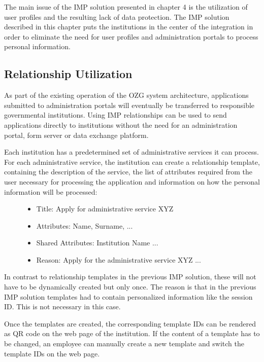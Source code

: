 The main issue of the IMP solution presented in chapter 4 is the utilization of user profiles and the resulting lack of data protection. The IMP solution described in this chapter puts the institutions in the center of the integration in order to eliminate the need for user profiles and administration portals to process personal information.

\subsection{Relationship Utilization}

As part of the existing operation of the OZG system architecture, applications submitted to administration portals will eventually be transferred to responsible governmental institutions. Using IMP relationships can be used to send applications directly to institutions without the need for an administration portal, form server or data exchange platform.

Each institution has a predetermined set of administrative services it can process. For each administrative service, the institution can create a relationship template, containing the description of the service, the list of attributes required from the user necessary for processing the application and information on how the personal information will be processed:

\begin{figure}[H]
\begin{itemize}
    \item Title: Apply for administrative service XYZ
    \item Attributes: Name, Surname, ... 
    \item Shared Attributes: Institution Name ...
    \item Reason: Apply for the administrative service XYZ ...
\end{itemize}
\end{figure}

In contrast to relationship templates in the previous IMP solution, these will not have to be dynamically created but only once. The reason is that in the previous IMP solution templates had to contain personalized information like the session ID. This is not necessary in this case.

Once the templates are created, the corresponding template IDs can be rendered as QR code on the web page of the institution. If the content of a template has to be changed, an employee can manually create a new template and switch the template IDs on the web page.

